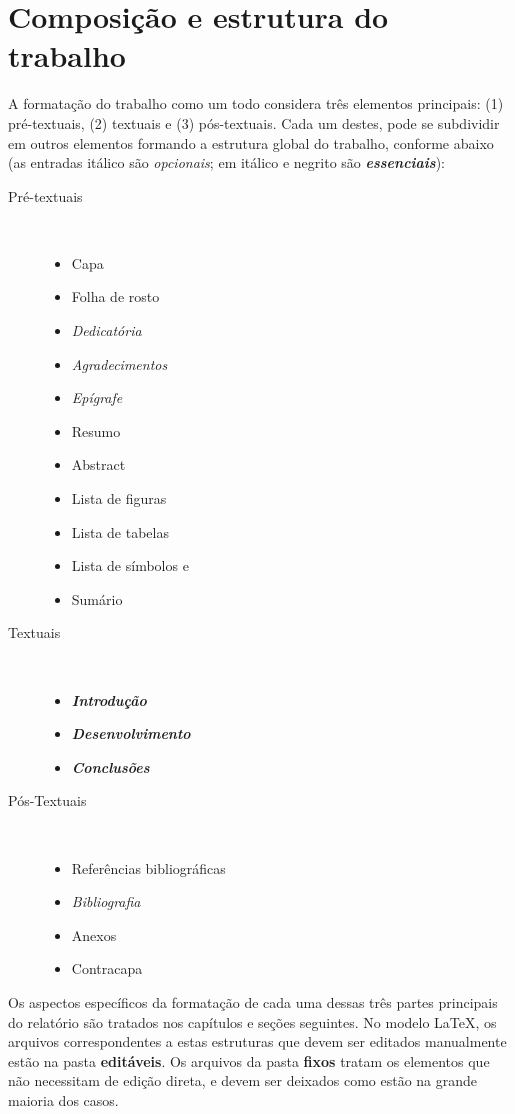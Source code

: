 \section{Composição e estrutura do trabalho}
A formatação do trabalho como um todo considera três elementos principais:
(1) pré-textuais, (2) textuais e (3) pós-textuais. Cada um destes, pode se
subdividir em outros elementos formando a estrutura global do trabalho,
conforme abaixo (as entradas itálico são \textit{opcionais}; em itálico e
negrito são \textbf{\textit{essenciais}}):
\begin{description}
\item [Pré-textuais] \
\begin{itemize}
\item Capa
\item Folha de rosto
\item \textit{Dedicatória}
\item \textit{Agradecimentos}
\item \textit{Epígrafe}
\item Resumo
\item Abstract
\item Lista de figuras
\item Lista de tabelas
\item Lista de símbolos e
\item Sumário
\end{itemize}
\item [Textuais] \
\begin{itemize}
\item \textbf{\textit{Introdução}}
\item \textbf{\textit{Desenvolvimento}}
\item \textbf{\textit{Conclusões}}
\end{itemize}
\item [Pós-Textuais] \
\begin{itemize}
\item Referências bibliográficas
\item \textit{Bibliografia}
\item Anexos
\item Contracapa
\end{itemize}
\end{description}
Os aspectos específicos da formatação de cada uma dessas três partes
principais do relatório são tratados nos capítulos e seções seguintes.
No modelo \LaTeX, os arquivos correspondentes a estas estruturas que devem
ser editados manualmente estão na pasta \textbf{editáveis}. Os arquivos
da pasta \textbf{fixos} tratam os elementos que não necessitam de
edição direta, e devem ser deixados como estão na grande maioria dos casos.
